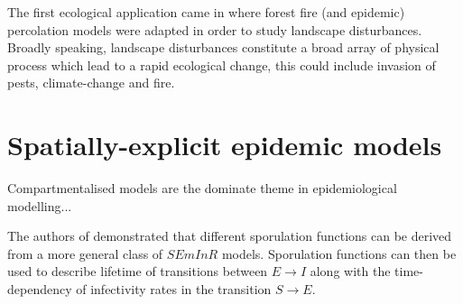 The first ecological application came in \cite{pub.1031591030} where forest fire (and epidemic) percolation models were adapted in order to study landscape disturbances. Broadly speaking, landscape disturbances constitute a broad array of physical process which lead to a rapid ecological change, this could include invasion of pests, climate-change and fire.


\section{Spatially-explicit epidemic models}
\label{ch2:lit-rev-compartmentalised-models}
Compartmentalised models are the dominate theme in epidemiological modelling...

\cite{segarra2001epidemic}

The authors of \cite{time-varying-infectivity} demonstrated that different sporulation functions can be derived from a more general class of $SEmInR$ models. 
Sporulation functions can then be used to describe lifetime of transitions between $E\rightarrow I$ along with the time-dependency of infectivity rates in the transition $S\rightarrow E$. 





